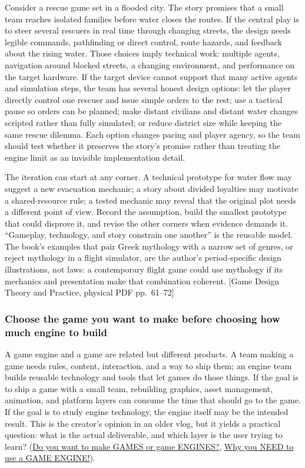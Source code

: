 Consider a rescue game set in a flooded city. The story promises that a small team reaches isolated families before water closes the routes. If the central play is to steer several rescuers in real time through changing streets, the design needs legible commands, pathfinding or direct control, route hazards, and feedback about the rising water. Those choices imply technical work: multiple agents, navigation around blocked streets, a changing environment, and performance on the target hardware. If the target device cannot support that many active agents and simulation steps, the team has several honest design options: let the player directly control one rescuer and issue simple orders to the rest; use a tactical pause so orders can be planned; make distant civilians and distant water changes scripted rather than fully simulated; or reduce district size while keeping the same rescue dilemma. Each option changes pacing and player agency, so the team should test whether it preserves the story's promise rather than treating the engine limit as an invisible implementation detail.

The iteration can start at any corner. A technical prototype for water flow may suggest a new evacuation mechanic; a story about divided loyalties may motivate a shared-resource rule; a tested mechanic may reveal that the original plot needs a different point of view. Record the assumption, build the smallest prototype that could disprove it, and revise the other corners when evidence demands it. ``Gameplay, technology, and story constrain one another'' is the reusable model. The book's examples that pair Greek mythology with a narrow set of genres, or reject mythology in a flight simulator, are the author's period-specific design illustrations, not laws: a contemporary flight game could use mythology if its mechanics and presentation make that combination coherent. {[}Game Design Theory and Practice, physical PDF pp.~61--72{]}

\subsubsection{Choose the game you want to make before choosing how much engine to build}\label{05-engine-i-ch009-choose-the-game-you-want-to-make-before-choosing-how-much-engine-to-build}

A game engine and a game are related but different products. A team making a game needs rules, content, interaction, and a way to ship them; an engine team builds reusable technology and tools that let games do those things. If the goal is to ship a game with a small team, rebuilding graphics, asset management, animation, and platform layers can consume the time that should go to the game. If the goal is to study engine technology, the engine itself may be the intended result. This is the creator's opinion in an older vlog, but it yields a practical question: what is the actual deliverable, and which layer is the user trying to learn? (\href{https://www.youtube.com/watch?v=Y4J4ZdQGEgo&t=0m20s}{Do you want to make GAMES or game ENGINES?}, \href{https://www.youtube.com/watch?v=QQ9MTzrsldo&t=0m1s}{Why you NEED to use a GAME ENGINE!}).

